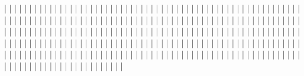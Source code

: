 |   |               |
|   |               |
|   |               |
|   |               |
|   |               |
|   |               |
|   |               |
|   |               |
|   |               |
|   |               |
|   |               |
|   |               |
|   |               |
|   |               |
|   |               |
|   |               |
|   |               |
|   |               |
|   |               |
|   |               |
|   |               |
|   |               |
|   |               |
|   |               |
|   |               |
|   |               |
|   |               |
|   |               |
|   |               |
|   |               |
|   |               |
|   |               |
|   |               |
|   |               |
|   |               |
|   |               |
|   |               |
|   |               |
|   |               |
|   |               |
|   |               |
|   |               |
|   |               |
|   |               |
|   |               |
|   |               |
|   |               |
|   |               |
|   |               |
|   |               |
|   |               |
|   |               |
|   |               |
|   |               |
|   |               |
|   |               |
|   |               |
|   |               |
|   |               |
|   |               |
|   |               |
|   |               |
|   |               |
|   |               |
|   |               |
|   |               |
|   |               |
|   |               |
|   |               |
|   |               |
|   |               |
|   |               |
|   |               |
|   |               |
|   |               |
|   |               |
|   |               |
|   |               |
|   |               |
|   |               |
|   |               |
|   |               |
|   |               |
|   |               |
|   |               |
|   |               |
|   |               |
|   |               |
|   |               |
|   |               |
|   |               |
|   |               |
|   |               |
|   |               |
|   |               |
|   |               |
|   |               |
|   |               |
|   |               |
|   |               |
|   |               |
|   |               |
|   |               |
|   |               |
|   |               |
|   |               |
|